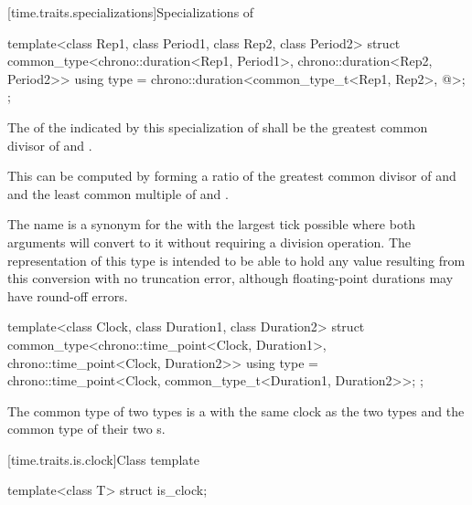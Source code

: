 [time.traits.specializations]{Specializations of }

%
\begin{itemdecl}
template<class Rep1, class Period1, class Rep2, class Period2>
struct common_type<chrono::duration<Rep1, Period1>, chrono::duration<Rep2, Period2>> {
  using type = chrono::duration<common_type_t<Rep1, Rep2>, @\seebelow@>;
};
\end{itemdecl}

\pnum
The  of the  indicated by this specialization of
 shall be the greatest common divisor of  and
.
\begin{note}
This can be computed by forming a ratio of the
greatest common divisor of  and  and the
least common multiple of  and .
\end{note}

\pnum
\begin{note}
The  name  is a synonym for the
 with the largest tick  possible where both
 arguments will convert to it without requiring a division
operation. The representation of this type is intended to be able to hold any
value resulting from this conversion with no truncation error, although
floating-point durations may have round-off errors.
\end{note}

%
\begin{itemdecl}
template<class Clock, class Duration1, class Duration2>
  struct common_type<chrono::time_point<Clock, Duration1>, chrono::time_point<Clock, Duration2>> {
    using type = chrono::time_point<Clock, common_type_t<Duration1, Duration2>>;
};
\end{itemdecl}

\pnum
The common type of two  types is a  with the same
clock as the two types and the common type of their two s.

[time.traits.is.clock]{Class template }

%
\begin{itemdecl}
template<class T> struct is_clock;
\end{itemdecl}

